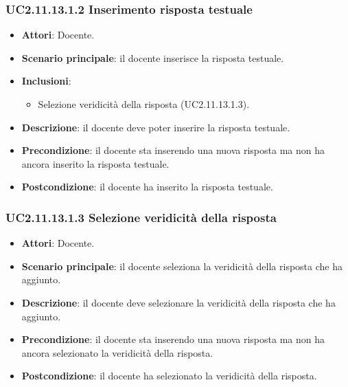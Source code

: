 \subsubsection{UC2.11.13.1.2 Inserimento risposta testuale}
\begin{itemize}
\item \textbf{Attori}: Docente.
\item \textbf{Scenario principale}: il docente inserisce la risposta testuale.
\item \textbf{Inclusioni}:
\begin{itemize}
\item Selezione veridicità della risposta (UC2.11.13.1.3).
\end{itemize}
\item \textbf{Descrizione}: il docente deve poter inserire la risposta testuale.
\item \textbf{Precondizione}: il docente sta inserendo una nuova risposta ma non ha ancora inserito la risposta testuale.
\item \textbf{Postcondizione}: il docente ha inserito la risposta testuale.
\end{itemize}
\subsubsection{UC2.11.13.1.3 Selezione veridicità della risposta}
\begin{itemize}
\item \textbf{Attori}: Docente.
\item \textbf{Scenario principale}: il docente seleziona la veridicità della risposta che ha aggiunto.
\item \textbf{Descrizione}: il docente deve selezionare la veridicità della risposta che ha aggiunto.
\item \textbf{Precondizione}: il docente sta inserendo una nuova risposta ma non ha ancora selezionato la veridicità della risposta.
\item \textbf{Postcondizione}: il docente ha selezionato la veridicità della risposta.
\end{itemize}
